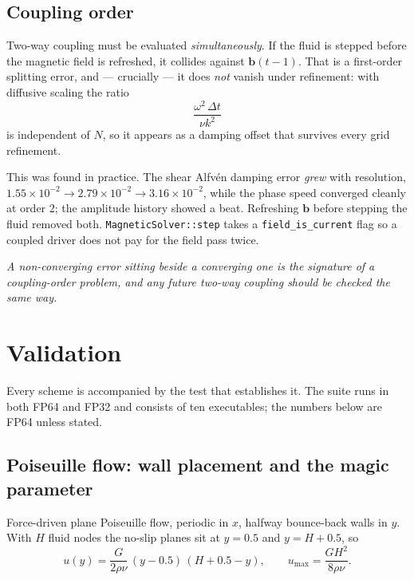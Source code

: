 \documentclass[11pt,a4paper]{article}
\newcommand{\code}[1]{\texttt{\small #1}}
\newcommand{\bb}{\bm{b}}
\begin{document}
\subsection{Coupling order}
\label{sec:couplingorder}

Two-way coupling must be evaluated \emph{simultaneously}. If the fluid is stepped
before the magnetic field is refreshed, it collides against $\bb(t-1)$. That is a
first-order splitting error, and --- crucially --- it does \emph{not} vanish under
refinement: with diffusive scaling the ratio
\begin{equation}
  \frac{\omega^2\,\Delta t}{\nu k^2}
\end{equation}
is independent of $N$, so it appears as a damping offset that survives every
grid refinement.

This was found in practice. The shear Alfv\'en damping error \emph{grew} with
resolution, $1.55\times10^{-2}\to2.79\times10^{-2}\to3.16\times10^{-2}$, while the
phase speed converged cleanly at order 2; the amplitude history showed a beat.
Refreshing $\bb$ before stepping the fluid removed both. \code{MagneticSolver::step}
takes a \code{field\_is\_current} flag so a coupled driver does not pay for the
field pass twice.

\medskip
\noindent\emph{A non-converging error sitting beside a converging one is the
signature of a coupling-order problem, and any future two-way coupling should be
checked the same way.}

\section{Validation}
\label{sec:validation}

Every scheme is accompanied by the test that establishes it. The suite runs in
both FP64 and FP32 and consists of ten executables; the numbers below are FP64
unless stated.

\subsection{Poiseuille flow: wall placement and the magic parameter}
\label{sec:poiseuille}

Force-driven plane Poiseuille flow, periodic in $x$, halfway bounce-back walls in
$y$. With $H$ fluid nodes the no-slip planes sit at $y=0.5$ and $y=H+0.5$, so
\begin{equation}
  u(y) = \frac{G}{2\rho\nu}\,(y-0.5)\,(H+0.5-y),
  \qquad u_{\max} = \frac{GH^2}{8\rho\nu}.
\end{equation}
\end{document}
